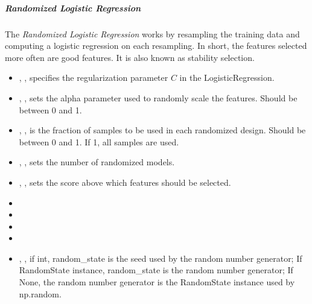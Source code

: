 \subparagraph{Randomized Logistic Regression}
\mbox{}

The \textit{Randomized Logistic Regression} works by resampling the training
data and computing a logistic regression on each resampling.
%
In short, the features selected more often are good features.
%
It is also known as stability selection.
%
\begin{itemize}
  \item {}, , specifies the
  regularization parameter $C$ in the LogisticRegression.
  \item {}, , sets
  the alpha parameter used to randomly scale
  the features. 
  Should be between 0 and 1.
  \item {}, , is the
  fraction of samples to be used in each randomized design.
  Should be between 0 and 1.
  If 1, all samples are used.
  \item {}, , sets the number
  of randomized models.
  \item {}, , sets
  the score above which features should be selected.
  \item {}
  \item \verDescriptionB{}
  \item {}
  \item \tolDescriptionC{}
  \item {}, , if int, random\_state is the seed used by the random number
  generator; If RandomState instance, random\_state is the random
  number generator; If None, the random number generator is the RandomState
  instance used by np.random.
\end{itemize}

